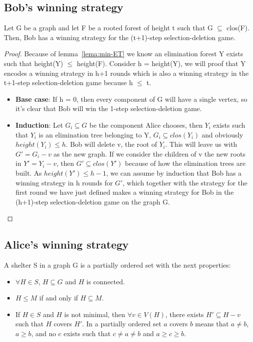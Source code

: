 \subsection{Bob's winning strategy}
\begin{lemma}
Let G be a graph and let F be a rooted forest of height t such that G $\subseteq$ clos(F). Then, Bob has a winning strategy for the (t+1)-step selection-deletion game.
\label{lemma:Bob-win}
\end{lemma}
\begin{proof}
Because of lemma~\ref{lema:min-ET} we know an elimination forest Y exists such that height(Y) $\leq$ height(F).
Consider h = height(Y), we will proof that Y encodes a winning strategy in h+1 rounds which is also a winning strategy in the t+1-step selection-deletion game because h $\leq$ t.
\begin{itemize}
  \item \textbf{Base case}: If h = 0, then every component of G will have a single vertex, so it's clear that Bob will win the 1-step selection-deletion game.
  \item \textbf{Induction}: Let $G_i \subseteq G$ be the component Alice chooses, then $Y_i$ exists such that $Y_i$ is an elimination tree belonging to Y, $G_i \subseteq clos(Y_i)$ and obviously $height(Y_i) \leq h$. Bob will delete v, the root of $Y_i$. This will leave us with $G' = G_i - v$ as the new graph. If we consider the children of v the new roots in $Y' = Y_i - v$, then $G' \subseteq clos(Y')$ because of how the elimination trees are built. As $height(Y') \leq h-1$, we can assume by induction that Bob has a winning strategy in h rounds for $G'$, which together with the strategy for the first round we have just defined makes a winning strategy for Bob in the (h+1)-step selection-deletion game on the graph G.
\end{itemize}
\end{proof}

\subsection{Alice's winning strategy}
\begin{definition}
A shelter S in a graph G is a partially ordered set with the next properties:
\begin{itemize}
  \item $\forall H \in S$, $H \subseteq G$ and $H$ is connected.
  \item $H \leq M$ if and only if $H \subseteq M$.
  \item If $H \in S$ and $H$ is not minimal, then $\forall v \in V(H)$, there exists $H' \subseteq H - v$ such that $H$ covers $H'$. In a partially ordered set $a$ covers $b$ means that $a \neq b$, $a \geq b$, and no c exists such that $c \neq a \neq b$ and $a \geq c \geq b$.
\end{itemize}
\end{definition}

